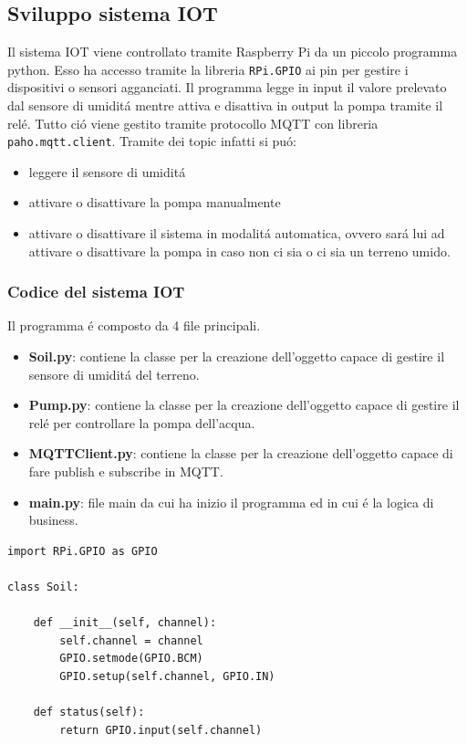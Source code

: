 \subsection{Sviluppo sistema IOT}
Il sistema IOT viene controllato tramite Raspberry Pi da un piccolo programma python. Esso ha accesso tramite la libreria \texttt{RPi.GPIO} ai pin per gestire i dispositivi o sensori agganciati. Il programma legge in input il valore prelevato dal sensore di umidit\'a mentre attiva e disattiva in output la pompa tramite il rel\'e. Tutto ci\'o viene gestito tramite protocollo MQTT con libreria \texttt{paho.mqtt.client}. Tramite dei topic infatti si pu\'o:
\begin{itemize}
    \item leggere il sensore di umidit\'a
    \item attivare o disattivare la pompa manualmente
    \item attivare o disattivare il sistema in modalit\'a automatica, ovvero sar\'a lui ad attivare o disattivare la pompa in caso non ci sia o ci sia un terreno umido.
\end{itemize}

\subsubsection{Codice del sistema IOT}
Il programma \'e composto da 4 file principali.
\begin{itemize}
    \item \textbf{Soil.py}: contiene la classe per la creazione dell'oggetto capace di gestire il sensore di umidit\'a del terreno.
    \item \textbf{Pump.py}: contiene la classe per la creazione dell'oggetto capace di gestire il rel\'e per controllare la pompa dell'acqua.
    \item \textbf{MQTTClient.py}: contiene la classe per la creazione dell'oggetto capace di fare publish e subscribe in MQTT.
    \item \textbf{main.py}: file main da cui ha inizio il programma ed in cui \'e la logica di business.
\end{itemize}

\begin{lstlisting}[caption=Soil.py, label=code:soil.py]
import RPi.GPIO as GPIO

class Soil:

    def __init__(self, channel):
        self.channel = channel
        GPIO.setmode(GPIO.BCM)
        GPIO.setup(self.channel, GPIO.IN)

    def status(self):
        return GPIO.input(self.channel)
\end{lstlisting}

